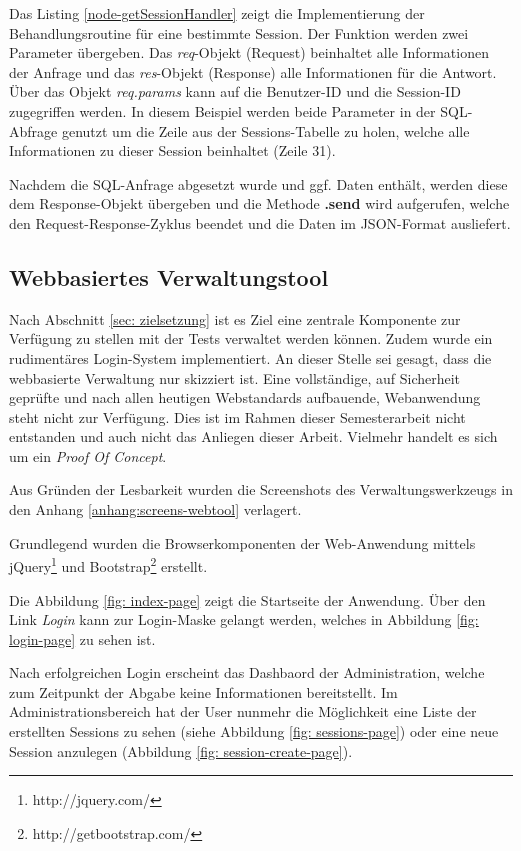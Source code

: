 Das Listing \ref{node-getSessionHandler} zeigt die Implementierung der Behandlungsroutine für eine bestimmte Session. Der Funktion werden zwei Parameter übergeben. Das \emph{req}-Objekt (Request) beinhaltet alle Informationen der Anfrage und das \emph{res}-Objekt (Response) alle Informationen für die Antwort. Über das Objekt \emph{req.params} kann auf die Benutzer-ID und die Session-ID zugegriffen werden. In diesem Beispiel werden beide Parameter in der SQL-Abfrage genutzt um die Zeile aus der Sessions-Tabelle zu holen, welche alle Informationen zu dieser Session beinhaltet (Zeile 31). 

Nachdem die SQL-Anfrage abgesetzt wurde und ggf. Daten enthält, werden diese dem Response-Objekt übergeben und die Methode \textbf{.send} wird aufgerufen, welche den Request-Response-Zyklus beendet und die Daten im JSON-Format ausliefert. 

\subsection{Webbasiertes Verwaltungstool \label{sec:webtool}}

\label{sec:web_verwaltung}
Nach Abschnitt \ref{sec: zielsetzung} ist es Ziel eine zentrale Komponente zur Verfügung zu stellen mit der Tests verwaltet werden können. 
Zudem wurde ein rudimentäres Login-System implementiert. 
An dieser Stelle sei gesagt, dass die webbasierte Verwaltung nur skizziert ist. 
Eine vollständige, auf Sicherheit geprüfte und nach allen heutigen Webstandards aufbauende, Webanwendung steht nicht zur Verfügung. 
Dies ist im Rahmen dieser Semesterarbeit nicht entstanden und auch nicht das Anliegen dieser Arbeit. 
Vielmehr handelt es sich um ein \emph{Proof Of Concept}. 

Aus Gründen der Lesbarkeit wurden die Screenshots des Verwaltungswerkzeugs in den Anhang \ref{anhang:screens-webtool} verlagert. 

Grundlegend wurden die Browserkomponenten der Web-Anwendung mittels jQuery\footnote{http://jquery.com/} und Bootstrap\footnote{http://getbootstrap.com/} erstellt.

Die Abbildung \ref{fig: index-page} zeigt die Startseite der Anwendung. 
Über den Link \emph{Login} kann zur Login-Maske gelangt werden, welches in Abbildung \ref{fig: login-page} zu sehen ist. 

Nach erfolgreichen Login erscheint das Dashbaord der Administration, welche zum Zeitpunkt der Abgabe keine Informationen bereitstellt. 
Im Administrationsbereich hat der User nunmehr die Möglichkeit eine Liste der erstellten Sessions zu sehen (siehe Abbildung \ref{fig: sessions-page}) oder eine neue Session anzulegen (Abbildung \ref{fig: session-create-page}). 

